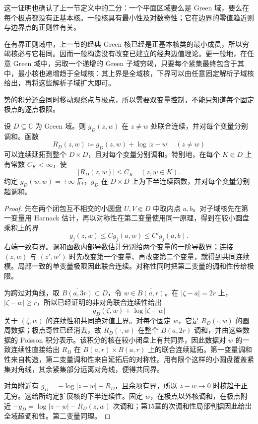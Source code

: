 这一证明也确认了上一节定义中的二分：一个平面区域要么是 Green 域，要么在每个极点都没有正基本核。一般核具有最小性及对数奇性；它在边界的零值趋近则与边界点的正则性有关。

\ProseParagraphBreak
在有界正则域中，上一节的经典 Green 核已经是正基本核类的最小成员，所以穷竭核必与它相同。因而一般构造没有改变已建立的经典边值理论。更一般地，在任意 Green 域中，另取一个递增的 Green 子域穷竭，只要每个紧集最终包含于其中，最小核也递增趋于全域核：其上界是全域核，下界可以由任意固定解析子域核给出，再将这些解析子域扩大即可。

\ProseParagraphBreak
势的积分还会同时移动观察点与极点，所以需要双变量控制，不能只知道每个固定极点的逐点极限。

\begin{proposition}\label{b3:prop:17-kernel-regularity}
设 \(D\subseteq\mathbb C\) 为 Green 域。则 \(g_D(z,w)\) 在 \(z\ne w\) 处联合连续，并对每个变量分别调和。函数
\[
 R_D(z,w)\coloneqq g_D(z,w)+\log|z-w|\quad(z\ne w)
\]
可以连续延拓到整个 \(D\times D\)，且对每个变量分别调和。特别地，在每个 \(K\Subset D\) 上有常数 \(C_K<\infty\)，使
\[
 |R_D(z,w)|\le C_K\quad(z,w\in K).
\]
约定 \(g_D(w,w)=+\infty\) 后，\(g_D\) 在 \(D\times D\) 上为下半连续函数，并对每个变量分别超调和。
\end{proposition}
\begin{proof}
先在两个闭包互不相交的小圆盘 \(U,V\Subset D\) 中取内点 \(a,b\)。对子域核先在第一变量用 Harnack 估计，再以对称性在第二变量使用同一原理，得到在较小圆盘乘积上的界
\[
 g_j(z,w)\le Cg_j(a,w)\le C' g_j(a,b).
\]
右端一致有界。调和函数内部导数估计分别给两个变量的一阶导数界；连接 \((z,w)\) 与 \((z',w')\) 时先改变第一个变量、再改变第二个变量，就得到共同连续模。局部一致的单变量极限因此联合连续。对称性同时把第二变量的调和性传给极限。

为跨过对角线，取 \(\overline{B(a,3r)}\subset D\)，令 \(w\in\overline{B(a,r)}\)。在 \(|\zeta-a|=2r\) 上，\(|\zeta-w|\ge r\)，所以已经证明的非对角联合连续性给出
\[
 g_D(\zeta,w)+\log|\zeta-w|
\]
关于 \((\zeta,w)\) 的连续性和共同绝对值上界。对每个固定 \(w\)，它是 \(R_D(\cdot,w)\) 的圆周数据；极点奇性已经消去，故 \(R_D(\cdot,w)\) 在整个 \(B(a,2r)\) 调和，并由这些数据的 Poisson 积分表示。该积分的核在较小闭盘上有共同界，因此数据对 \(w\) 的一致连续性直接给出 \(R_D\) 在 \(B(a,r)\times B(a,r)\) 上的联合连续延拓。第一变量调和性来自构造，第二变量调和性来自延拓后的对称性。用有限个这样的小圆盘覆盖紧集对角线，其余紧集部分远离对角线，便得共同界。

对角附近有 \(g_D=-\log|z-w|+R_D\)，且余项有界，所以 \(z-w\to0\) 时核趋于正无穷。这给所约定扩展核的下半连续性。固定 \(w\)，在极点以外核调和，在极点附近 \(-g_D=\log|z-w|-R_D(z,w)\) 次调和；第15章的次调和性局部判据因此给出全域超调和性。第二变量同理。
\end{proof}

